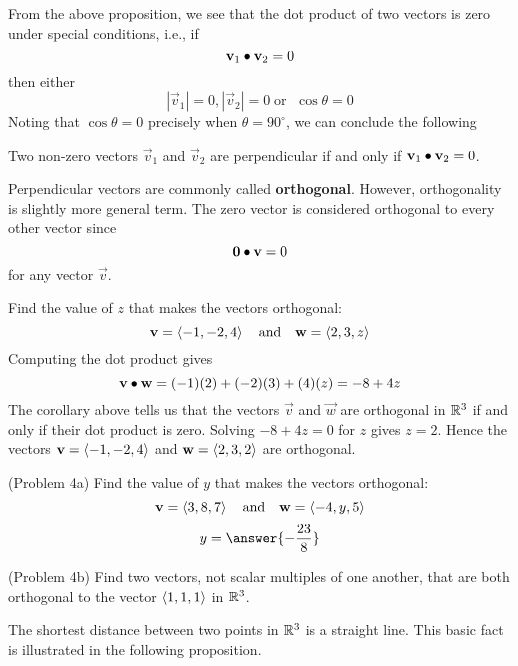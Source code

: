 \documentclass[handout]{ximera}
\begin{document}
From the above proposition, we see that the dot product of two vectors is zero under special conditions, i.e.,  if 
\[
\mathbf{v}_1 \bullet \mathbf{v}_2 = 0
\]
then either
\[
|\vec{v}_1| = 0, |\vec{v}_2| = 0 \; \text{or } \; \cos \theta = 0
\]
Noting that $\cos \theta = 0$ precisely when $\theta = 90^\circ$, we can conclude the following

\begin{corollary} 
Two non-zero vectors $\vec{v}_1$ and $\vec{v}_2$ are perpendicular if and only if $\mathbf{v}_1 \bullet \mathbf{v}_2 = 0$.
\end{corollary}

Perpendicular vectors are commonly called \textbf{orthogonal}. However, orthogonality is slightly more general term. 
The zero vector is considered orthogonal to every other vector since
\[
\mathbf 0 \bullet \mathbf v = 0
\]
for any vector $\vec v$.

\begin{example}[Example 4]
Find the value of $z$ that makes the vectors orthogonal:
\[
\mathbf v = \left\langle -1,-2, 4\right\rangle \quad \text{and} \quad \mathbf w = \left\langle 2,3, z\right\rangle
\]
Computing the dot product gives
\[
\mathbf v \bullet \mathbf w = (-1)(2) + (-2)(3) + (4)(z) = -8+4z
\]
The corollary above tells us that the vectors $\vec v$ and $\vec w$ are orthogonal in $\mathbb R^3$ if and only if their 
dot product is zero. Solving $-8 + 4z = 0$ for $z$
gives $z = 2$. Hence the vectors $\mathbf v = \left\langle -1,-2, 4\right\rangle$ and $\mathbf w = \left\langle 2,3, 2\right\rangle$ are orthogonal.
\end{example}

\begin{problem}(Problem 4a) 
Find the value of $y$ that makes the vectors orthogonal:
\[
\mathbf v = \left\langle 3,8, 7\right\rangle \quad \text{and} \quad \mathbf w = \left\langle -4,y, 5\right\rangle
\]
\[
y = \answer{-\frac{23}{8}}
\]
\end{problem}

\begin{problem}(Problem 4b) Find two vectors, not scalar multiples of one another, that are both orthogonal to the 
vector $\left\langle 1,1,1\right\rangle$ in $\mathbb R^3$.
\end{problem}


The shortest distance between two points in $\mathbb R^3$ is a straight line.  This basic fact is illustrated in the following proposition.
\end{document}
